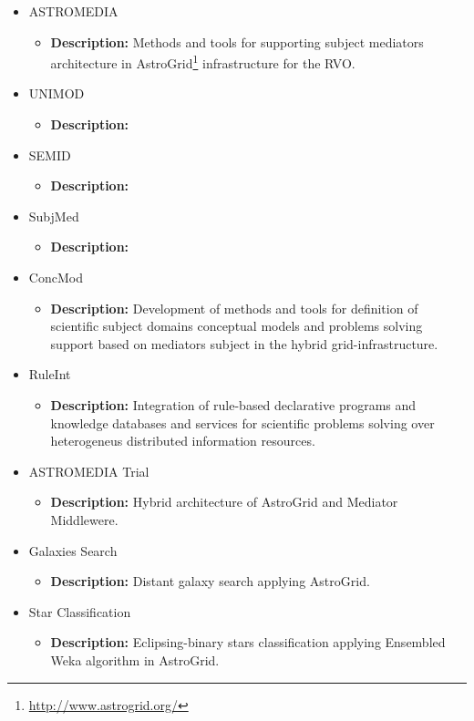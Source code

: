 \begin{itemize}
\begin{itemize}
\begin{itemize}
			\end{itemize}
		\item ASTROMEDIA
			\begin{itemize}
				\item \textbf{Description:} Methods and tools for supporting
subject mediators architecture in
AstroGrid\footnote{\url{http://www.astrogrid.org/}} infrastructure for the RVO.
			\end{itemize}
		\item UNIMOD
			\begin{itemize}
				\item \textbf{Description:}
			\end{itemize}
		\item SEMID
			\begin{itemize}
				\item \textbf{Description:}
			\end{itemize}
		\item SubjMed
			\begin{itemize}
				\item \textbf{Description:}
			\end{itemize}
		\item ConcMod
			\begin{itemize}
				\item \textbf{Description:} Development of methods and tools
for definition of scientific subject domains conceptual models and problems
solving support based on mediators subject in the hybrid grid-infrastructure.
			\end{itemize}
		\item RuleInt
			\begin{itemize}
				\item \textbf{Description:} Integration of rule-based
declarative programs and knowledge databases and services for scientific
problems solving over heterogeneus distributed information resources.
			\end{itemize}
		\item ASTROMEDIA Trial
			\begin{itemize}
				\item \textbf{Description:} Hybrid architecture of AstroGrid
and Mediator Middlewere.
			\end{itemize}
		\item Galaxies Search
			\begin{itemize}
                \item \textbf{Description:} Distant galaxy search applying
AstroGrid.
			\end{itemize}
		\item Star Classification
			\begin{itemize}
				\item \textbf{Description:} Eclipsing-binary stars
classification applying Ensembled Weka algorithm in AstroGrid.
			\end{itemize}
	\end{itemize}
\end{itemize}

